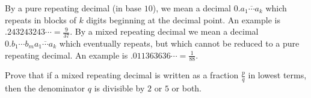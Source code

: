 By a pure repeating decimal (in base $10$), we mean a decimal $0.\overline{a_1\cdots a_k}$ which repeats in blocks of $k$ digits beginning at the decimal point.  An example is $.243243243\cdots = \tfrac{9}{37}$.  By a mixed repeating decimal we mean a decimal $0.b_1\cdots b_m\overline{a_1\cdots a_k}$ which eventually repeats, but which cannot be reduced to a pure repeating decimal.  An example is $.011363636\cdots = \tfrac{1}{88}$.

Prove that if a mixed repeating decimal is written as a fraction $\tfrac pq$ in lowest terms, then the denominator $q$ is divisible by $2$ or $5$ or both.
